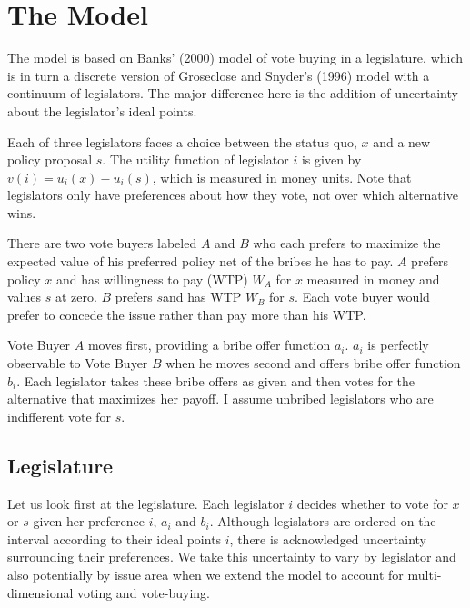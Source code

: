 \documentclass[12pt]{article}
\begin{document}


\section{The Model}
\label{sec:model}

The model is based on Banks' (2000) model of vote buying in a legislature, which is in turn a discrete version of Groseclose and Snyder's (1996) model with a continuum of legislators. The major difference here is the addition of uncertainty about the legislator's ideal points.

Each of three legislators faces a choice between the status quo, $x$ and a new policy proposal $s$. The utility function of legislator $i$ is given by $v(i) = u_i(x) - u_i(s)$, which is measured in money units. Note that legislators only have preferences about how they vote, not over which alternative wins.

There are two vote buyers labeled $A$ and $B$ who each prefers to maximize the expected value of his preferred policy net of the bribes he has to pay. $A$ prefers policy $x$ and has willingness to pay (WTP) $W_A$ for $x$ measured in money and values $s$ at zero. $B$ prefers $s$and has WTP $W_B$ for $s$. Each vote buyer would prefer to concede the issue rather than pay more than his WTP.

Vote Buyer $A$ moves first, providing a bribe offer function $a_i$. $a_i$ is perfectly observable to Vote Buyer $B$ when he moves second and offers bribe offer function $b_i$. Each legislator takes these bribe offers as given and then votes for the alternative that maximizes her payoff. I assume unbribed legislators who are indifferent vote for $s$.

\subsection{Legislature}
Let us look first at the legislature. Each legislator $i$ decides whether to vote for $x$ or $s$ given her preference $i$, $a_i$ and $b_i$. Although legislators are ordered on the interval according to their ideal points $i$, there is acknowledged uncertainty surrounding their preferences. We take this uncertainty to vary by legislator and also potentially by issue area when we extend the model to account for multi-dimensional voting and vote-buying.
\end{document}
